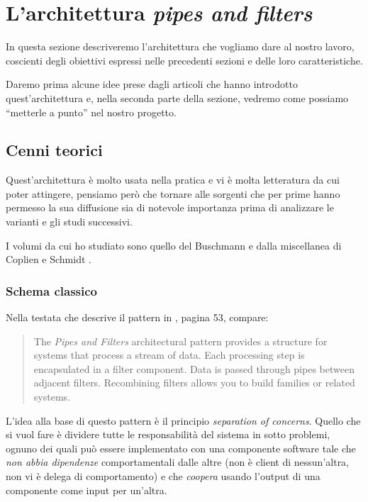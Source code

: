 \section{L'architettura \emph{pipes and filters}}

In questa sezione descriveremo l'architettura che vogliamo dare al
nostro lavoro, coscienti degli obiettivi espressi nelle precedenti
sezioni e delle loro caratteristiche.

Daremo prima alcune idee prese dagli articoli che hanno introdotto
quest'architettura e, nella seconda parte della sezione, vedremo come
possiamo ``metterle a punto'' nel nostro progetto.

\subsection{Cenni teorici}
Quest'architettura \`e molto usata nella pratica e vi \`e molta
letteratura da cui poter attingere, pensiamo per\`o che tornare alle
sorgenti che per prime hanno permesso la sua diffusione sia di
notevole importanza prima di analizzare le varianti e gli studi
successivi.

I volumi da cui ho studiato sono quello del Buschmann \cite{POSA} e
dalla miscellanea di Coplien e Schmidt \cite{PLOPD}.

\subsubsection{Schema classico}
Nella testata che descrive il pattern in \cite{POSA}, pagina 53,
compare:
\begin{quotation}
  The \emph{Pipes and Filters} architectural pattern provides a
  structure for systems that process a stream of data. Each processing
  step is encapsulated in a filter component. Data is passed through
  pipes between adjacent filters. Recombining filters allows you to
  build families or related systems.
\end{quotation}
L'idea alla base di questo pattern \`e il principio \emph{separation
  of concerns}. Quello che si vuol fare \`e dividere tutte le
responsabilit\`a del sistema in sotto problemi, ognuno dei quali pu\`o
essere implementato con una componente software tale che \emph{non
  abbia dipendenze} comportamentali dalle altre (non \`e client di
nessun'altra, non vi \`e delega di comportamento) e che \emph{coopera}
usando l'output di una componente come input per un'altra.

